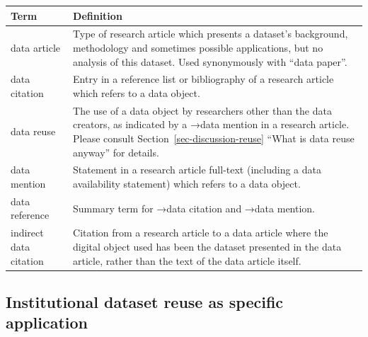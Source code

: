 \documentclass[
  letterpaper,
  DIV=11,
  numbers=noendperiod]{scrartcl}
\begin{document}
\begin{longtable}[]{@{}
  >{\raggedright\arraybackslash}p{}
  >{\raggedright\arraybackslash}p{}@{}}
\toprule\noalign{}
\begin{minipage}[b]{\linewidth}\raggedright
Term
\end{minipage} & \begin{minipage}[b]{\linewidth}\raggedright
Definition
\end{minipage} \\
\midrule\noalign{}
\endhead
\bottomrule\noalign{}
\endlastfoot
data article\label{gls-data-article}{} & Type of research
article which presents a dataset's background, methodology and sometimes
possible applications, but no analysis of this dataset. Used
synonymously with ``data paper''. \\
data citation\label{gls-data-citation}{} & Entry in a
reference list or bibliography of a research article which refers to a
data object. \\
data reuse\label{gls-data-reuse}{} & The use of a data
object by researchers other than the data creators, as indicated by a
→data mention in a research article. Please consult
Section~\ref{sec-discussion-reuse} ``What is data reuse anyway'' for
details. \\
data mention\label{gls-data-mention}{} & Statement in a
research article full-text (including a data availability statement)
which refers to a data object. \\
data reference\label{gls-data-reference}{} & Summary term
for →data citation and →data mention. \\
indirect data
citation\label{gls-indirect-data-citation}{} & Citation
from a research article to a data article where the digital object used
has been the dataset presented in the data article, rather than the text
of the data article itself. \\
\end{longtable}

\endgroup
\addtocounter{table}{-1}
\setcounter{section}{\GlossarySavedSection}
\setcounter{subsection}{\GlossarySavedSubsection}
\setcounter{subsubsection}{\GlossarySavedSubsubsection}
\renewcommand{\theHtable}{\GlossarySavedHTable}
\newpage

\subsection{Institutional dataset reuse as specific
application}\label{sec-intro-application}
\end{document}
